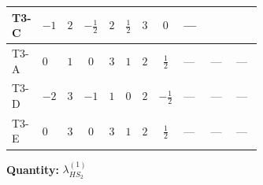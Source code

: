 \documentclass[8pt]{article}
\begin{document}
\begin{landscape}
\begin{longtable}{@{}llcccccc >{\raggedright\arraybackslash}p{0.21\linewidth} >{\raggedright\arraybackslash}p{0.21\linewidth} >{\raggedright\arraybackslash}p{0.21\linewidth}@{}}
\midrule
T3-C & $-1$ & $2$ & $-\frac{1}{2}$ & $2$ & $\frac{1}{2}$ & $3$ & $0$ & --- & \scriptsize\adjustbox{max width=\linewidth}{$\begin{gathered} +{\lambda_{H H^\dagger S_1^\dagger S_2^\dagger}^{\rm Cross}} \left(\frac{3}{4} \operatorname{Tr}\!\left({y_1}\,\left({y_2}\right)^{\dagger}\right)+4 \left({\lambda_{H H^\dagger S_1^\dagger S_2^\dagger}^{\rm Cross}}\right)^{*}+3 \left({\lambda_{10}}\right)^{*}\right)\end{gathered}$} & \scriptsize\adjustbox{max width=\linewidth}{$\begin{gathered} +\frac{3}{4} \left({\lambda_{H H^\dagger S_1^\dagger S_2^\dagger}^{\rm Cross}}\right)^{*} \operatorname{Tr}\!\left({y_2}\,\left({y_1}\right)^{\dagger}\right)\end{gathered}$} \\
\midrule
T3-A & $0$ & $1$ & $0$ & $3$ & $1$ & $2$ & $\frac{1}{2}$ & --- & --- & --- \\
\midrule
T3-D & $-2$ & $3$ & $-1$ & $1$ & $0$ & $2$ & $-\frac{1}{2}$ & --- & --- & --- \\
\midrule
T3-E & $0$ & $3$ & $0$ & $3$ & $1$ & $2$ & $\frac{1}{2}$ & --- & --- & --- \\
\midrule
\bottomrule
\end{longtable}
\clearpage
\noindent\textbf{Quantity: }$\lambda_{HS_2}^{(1)}$\par\smallskip

\end{landscape}
\end{document}
